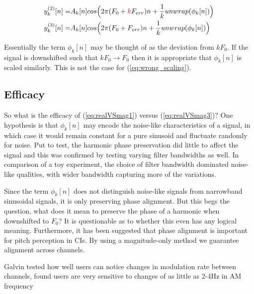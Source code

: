 \documentclass [11pt, proquest,oneside] {ganter_thesis}[2015/03/03]
\newcommand*{\mathcolor}{}
\def\mathcolor#1#{\mathcoloraux{#1}}
\newcommand*{\mathcoloraux}[3]{%
  \protect\leavevmode
  \begingroup
    \color#1{#2}#3%
  \endgroup
}
\begin{document}
\begin{align}
\label{eq:wrong_scaling}
y_k^{(2)}[n] =& A_k[n]cos\Big(2\pi (F_0 + \mathcolor{red}{k}F_{err})n + \frac{1}{k}unwrap(\phi_k[n])\Big) \\
y_k^{(3)}[n] =& A_k[n]cos\Big(2\pi (F_0 + F_{err})n + \frac{1}{k}unwrap(\phi_k[n])\Big)
\end{align}

Essentially the term $\phi_k[n]$ may be thought of as the deviation from $kF_0$.  If the signal is downshifted such that $kF_0 \longrightarrow F_0$ then it is appropriate that $\phi_k[n]$ is scaled similarly.  This is not the case for (\ref{eq:wrong_scaling}).

\subsection{Efficacy}

So what is the efficacy of (\ref{eq:realVSmag1}) versus (\ref{eq:realVSmag3})?  One hypothesis is that $\phi_k[n]$ may encode the noise-like characteristics of a signal, in which case it would remain constant for a pure sinusoid and fluctuate randomly for noise.  Put to test, the harmonic phase preservation did little to affect the signal and this was confirmed by testing varying filter bandwidths as well.  In comparison of a toy experiment, the choice of filter bandwidth dominated noise-like qualities, with wider bandwidth capturing more of the variations.

Since the term $\phi_k[n]$ does not distinguish noise-like signals from narrowband sinusoidal signals, it is only preserving phase alignment.  But this begs the question, what does it mean to preserve the phase of a harmonic when downshifted to $F_0$?  It is questionable as to whether this even has any logical meaning.  Furthermore, it has been suggested \cite{laneau2006improved} that phase alignment is important for pitch perception in CIs.  By using a magnitude-only method we guarantee alignment across channels.

Galvin tested how well users can notice changes in modulation rate between channels, found users are very sensitive to changes of as little as 2-4Hz in AM frequency

\end{document}
